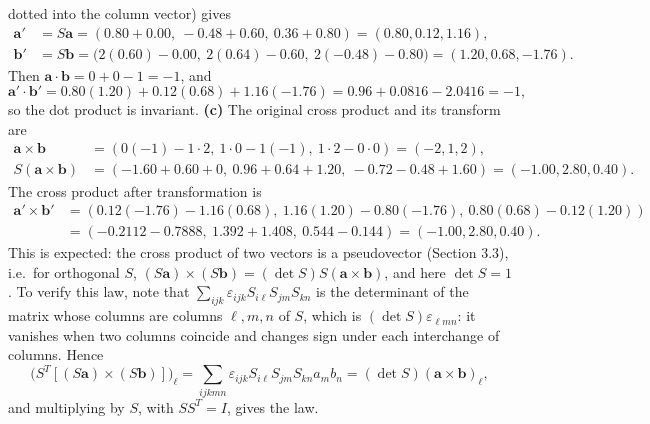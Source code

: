 dotted into the column vector) gives
\[
\begin{aligned}
\mathbf a'&=S\mathbf a=(0.80+0.00,\ -0.48+0.60,\ 0.36+0.80)
=(0.80,0.12,1.16),\\
\mathbf b'&=S\mathbf b=\bigl(2(0.60)-0.00,\ 2(0.64)-0.60,\
2(-0.48)-0.80\bigr)=(1.20,0.68,-1.76).
\end{aligned}
\]
Then $\mathbf a\cdot\mathbf b=0+0-1=-1$, and
\[
\mathbf a'\cdot\mathbf b'
=0.80(1.20)+0.12(0.68)+1.16(-1.76)
=0.96+0.0816-2.0416=-1,
\]
so the dot product is invariant.
\textbf{(c)} The original cross product and its transform are
\[
\begin{aligned}
\mathbf a\times\mathbf b
&=(0(-1)-1\cdot2,\ 1\cdot0-1(-1),\ 1\cdot2-0\cdot0)=(-2,1,2),\\
S(\mathbf a\times\mathbf b)
&=(-1.60+0.60+0,\ 0.96+0.64+1.20,\ -0.72-0.48+1.60)
=(-1.00,2.80,0.40).
\end{aligned}
\]
The cross product after transformation is
\[
\begin{aligned}
\mathbf a'\times\mathbf b'
&=(0.12(-1.76)-1.16(0.68),\
1.16(1.20)-0.80(-1.76),\
0.80(0.68)-0.12(1.20))\\
&=(-0.2112-0.7888,\ 1.392+1.408,\ 0.544-0.144)
=(-1.00,2.80,0.40).
\end{aligned}
\]
This is expected: the cross product of two vectors is a pseudovector
(Section 3.3), i.e.\ for orthogonal $S$,
$(S\mathbf a)\times(S\mathbf b)=(\det S)S(\mathbf a\times\mathbf b)$,
and here $\det S=1$.
To verify this law, note that
$\sum_{ijk}\varepsilon_{ijk}S_{i\ell}S_{jm}S_{kn}$ is the determinant of
the matrix whose columns are columns $\ell,m,n$ of $S$, which is
$(\det S)\varepsilon_{\ell mn}$: it vanishes when two columns coincide
and changes sign under each interchange of columns. Hence
\[
\bigl(S^T[(S\mathbf a)\times(S\mathbf b)]\bigr)_\ell
=\sum_{ijkmn}\varepsilon_{ijk}S_{i\ell}S_{jm}S_{kn}a_mb_n
=(\det S)(\mathbf a\times\mathbf b)_\ell ,
\]
and multiplying by $S$, with $SS^T=I$, gives the law.

